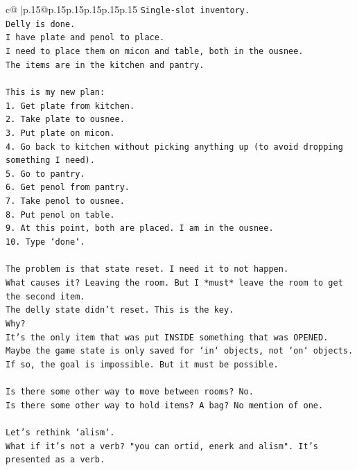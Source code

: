 \documentclass{article}
\begin{document}
{\begin{supertabular}{c@{$\;$}|p{.15\linewidth}@{}p{.15\linewidth}p{.15\linewidth}p{.15\linewidth}p{.15\linewidth}p{.15\linewidth}}
{{{\texttt{Single{-}slot inventory.} \\
\texttt{Delly is done.} \\
\texttt{I have plate and penol to place.} \\
\texttt{I need to place them on micon and table, both in the ousnee.} \\
\texttt{The items are in the kitchen and pantry.} \\
\\ 
\texttt{This is my new plan:} \\
\texttt{1. Get plate from kitchen.} \\
\texttt{2. Take plate to ousnee.} \\
\texttt{3. Put plate on micon.} \\
\texttt{4. Go back to kitchen without picking anything up (to avoid dropping something I need).} \\
\texttt{5. Go to pantry.} \\
\texttt{6. Get penol from pantry.} \\
\texttt{7. Take penol to ousnee.} \\
\texttt{8. Put penol on table.} \\
\texttt{9. At this point, both are placed. I am in the ousnee.} \\
\texttt{10. Type `done`.} \\
\\ 
\texttt{The problem is that state reset. I need it to not happen.} \\
\texttt{What causes it? Leaving the room. But I *must* leave the room to get the second item.} \\
\texttt{The delly state didn't reset. This is the key.} \\
\texttt{Why?} \\
\texttt{It's the only item that was put INSIDE something that was OPENED.} \\
\texttt{Maybe the game state is only saved for `in` objects, not `on` objects.} \\
\texttt{If so, the goal is impossible. But it must be possible.} \\
\\ 
\texttt{Is there some other way to move between rooms? No.} \\
\texttt{Is there some other way to hold items? A bag? No mention of one.} \\
\\ 
\texttt{Let's rethink `alism`.} \\
\texttt{What if it's not a verb? "you can ortid, enerk and alism". It's presented as a verb.} \\
}}}
\end{supertabular}}
\end{document}
